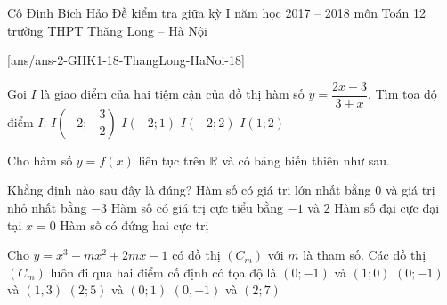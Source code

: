 \begin{name}
{Cô Đinh Bích Hảo}
{ Đề kiểm tra giữa kỳ I năm học 2017 – 2018 môn Toán 12 trường THPT Thăng Long – Hà Nội}
\end{name}
\setcounter{ex}{0}
[ans/ans-2-GHK1-18-ThangLong-HaNoi-18]
\begin{ex}%
Gọi $I$ là giao điểm của hai tiệm cận của đồ thị hàm số $y=\dfrac{2x-3}{3+x}$. Tìm tọa độ điểm $I$.
\choice
{$I\left(-2;-\dfrac{3}{2}\right)$}
{$I(-2;1)$}
{\True  $I(-2;2)$}
{$I(1;2)$}
\end{ex}

\begin{ex}%
Cho hàm số $y=f(x)$ liên tục trên $\mathbb{R}$ và có bảng biến thiên như sau. 
\begin{center}
\end{center}
Khẳng định nào sau đây là đúng?
\choice
{ Hàm số có giá trị lớn nhất bằng $0$ và giá trị nhỏ nhất bằng $-3$}
{Hàm số có giá trị cực tiểu bằng $-1$ và $2$}
{\True Hàm số đại cực đại tại $x=0$}
{Hàm số có đứng hai cực trị}



\end{ex}


\begin{ex}%
Cho $y=x^3-mx^2+2mx-1$ có đồ thị $(C_m)$ với $m$ là tham số. Các đồ thị $(C_m)$ luôn đi qua hai điểm cố định có tọa độ là 
\choice
{$(0;-1)$ và $(1;0)$}
{$(0;-1)$ và $(1,3)$}
{$(2;5)$ và $(0;1)$}
{\True $(0,-1)$ và $(2;7)$}
\end{ex}

